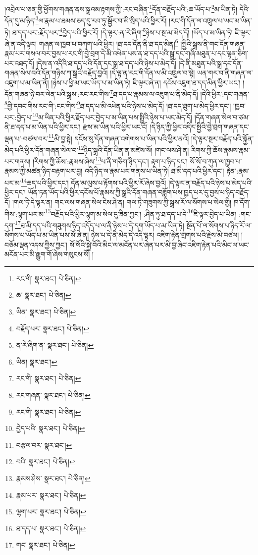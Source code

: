 །འབྲེལ་པ་ཅན་གྱི་ཕྱོགས་གཞན་ནས་སྒྲའམ་རྟགས་ཀྱི་:རང་བཞིན་\footnote{རང་གི་  སྣར་ཐང་།  པེ་ཅིན། }དོན་བརྗོད་པའི་:ཆ་ཡོད་པ་\footnote{ཆ་  སྣར་ཐང་།  པེ་ཅིན། }མ་ཡིན་ཏེ། དེའི་དོན་དུ་མ་ཉིད་\footnote{ཡིན་  སྣར་ཐང་།  པེ་ཅིན། }ལ་རྣམ་པ་ཐམས་ཅད་དུ་རབ་ཏུ་སྦྱོར་བ་མི་སྲིད་པའི་ཕྱིར་རོ། །རང་གི་དོན་ལ་འཁྲུལ་པ་ཡང་མ་ཡིན་ཏེ། ཐ་དད་པར་:རྗོད་པར་\footnote{བརྗོད་པར་  སྣར་ཐང་།  པེ་ཅིན། }བྱེད་པའི་ཕྱིར་རོ། །དེ་ལྟར་:ན་རེ་ཞིག་\footnote{ན་རེ་ཞིག་ན་  སྣར་ཐང་།  པེ་ཅིན། }ཉེས་པ་སྔ་མ་མེད་དོ། །ཡོད་པ་མ་ཡིན་ཏེ། ཇི་ལྟར་ཞེ་ན་འདི་ལྟར། གཞན་ལ་ཁྱབ་པ་བཀག་པའི་ཕྱིར། །ཐ་དད་དོན་ནི་ཐ་དད་མིན།\footnote{ཡིན།  སྣར་ཐང་། } །སྤྱིའི་སྒྲས་ནི་གང་དོན་གཞན་རྣམ་པར་གསལ་བར་བྱས་པ་རང་གི་བྱེ་བྲག་དེ་མི་འཕེན་པས་ན་ཐ་དད་པའི་སྒྲ་དང་གཞི་མཐུན་པ་དང་ལྷན་ཅིག་པར་འཐད་དོ། །དེས་ན་འདིའི་ཐ་དད་པའི་དོན་དང་སྒྲ་ཐ་དད་པའི་ཉེས་པ་མེད་དོ། །དེ་ནི་མཐུན་པའི་སྒྲ་དང་དོན་གཞན་སེལ་བའི་དོན་གཉིས་ཀ་སྒྲའི་བརྗོད་བྱའོ། །དེ་ལྟ་ན་རང་གི་དོན་ལ་མི་འཁྲུལ་བ་སྟེ། ཡན་གར་བ་ནི་གཞན་ལ་འཇུག་པ་མ་ཡིན་ནོ། །ཉེས་པ་ཕྱི་མ་ཡང་ཡོད་པ་མ་ཡིན་ཏེ། ཇི་ལྟར་ཞེ་ན། དངོས་འཇུག་ཐ་དད་མིན་ཕྱིར་ཡང་། །དོན་གཞན་ཉེ་བར་ལེན་པའི་སྒྲས་:རང་རང་གིས་\footnote{རང་གི་  སྣར་ཐང་།  པེ་ཅིན། }ཐ་དད་པ་རྣམས་ལ་འཇུག་པ་ནི་མེད་དོ། །དེའི་ཕྱིར་:དང་གཞན་\footnote{རང་གཞན་  སྣར་ཐང་།  པེ་ཅིན། }གྱི་དབང་གིས་རང་གི་:ངང་གིས་\footnote{རང་གི་  སྣར་ཐང་།  པེ་ཅིན། }ཐ་དད་པ་མི་འཕེན་པའི་ཉེས་པ་མེད་དོ། །ཐ་དད་ཐུག་པ་མེད་ཕྱིར་དང་། །ཁྱབ་པར་:བྱེད་པ་\footnote{བྱེད་པའི་  སྣར་ཐང་།  པེ་ཅིན། }མ་ཡིན་པའི་ཕྱིར་རྗོད་པར་བྱེད་པ་མ་ཡིན་པས་སྤྱིའི་ཉེས་པ་ཡང་མེད་དོ། །དོན་གཞན་སེལ་བ་ཙམ་ནི་ཐ་དད་པ་མ་ཡིན་པའི་ཕྱིར་དང་། རྫས་མ་ཡིན་པའི་ཕྱིར་ཡང་ངོ། །དེ་ཉིད་ཀྱི་ཕྱིར་འདིར་སྤྱིའི་བྱེ་བྲག་གཞན་དང་ལྡན་པ་:བཙལ་བར་\footnote{བརྩལ་བར་  སྣར་ཐང་། }མི་བྱ་སྟེ། དངོས་སུ་དོན་གཞན་འགེགས་པ་ཡིན་པའི་ཕྱིར་ནའོ། །དེ་ལྟར་སྔར་བརྗོད་པའི་སྐྱོན་མེད་པའི་ཕྱིར་དོན་གཞན་སེལ་བ་\footnote{བའི་  སྣར་ཐང་།  པེ་ཅིན། }ཉིད་སྒྲའི་དོན་ཡིན་ན་མཛེས་སོ། །གང་ལས་ཤེ་ན། རིགས་ཀྱི་ཆོས་རྣམས་རྣམ་པར་གནས། །རིགས་ཀྱི་ཆོས་:རྣམས་ཞེས་\footnote{རྣམས་ཤེས་  སྣར་ཐང་།  པེ་ཅིན། }པ་ནི་གཅིག་ཉིད་དང་། རྟག་པ་ཉིད་དང་། སོ་སོ་བ་ཀུན་ལ་ཁྱབ་པ་རྣམས་ཀྱི་མཚན་ཉིད་བརྟག་པར་བྱ། འདི་ཉིད་ལ་རྣམ་པར་གནས་པ་ཡིན་ཏེ། ཐ་མི་དད་པའི་ཕྱིར་དང་། རྟེན་:རྣམ་པར་མ་\footnote{རྣམ་པར་  སྣར་ཐང་།  པེ་ཅིན། }ཆད་པའི་ཕྱིར་དང་། དོན་མ་ལུས་པ་རྟོགས་པའི་ཕྱིར་རོ་ཞེས་བྱའོ། །དེ་ལྟར་ན་བརྗོད་པའི་ཉེས་པ་མེད་པའི་ཕྱིར་དང་། ཡོན་ཏན་ཡོད་པའི་ཕྱིར་དངོས་པོ་རྣམས་ཀྱི་སྒྲའི་དོན་གཞན་བཟློག་པས་ཁྱད་པར་དུ་བྱས་པ་ཉིད་བརྗོད་དོ། །གལ་ཏེ་དེ་ལྟར་ན། གང་ལས་གཞན་སེལ་ངེས་ཤེ་ན། གལ་ཏེ་གཟུགས་ཀྱི་སྒྲས་རོ་ལ་སོགས་པ་སེལ་གྱི། ཁ་དོག་གིས་:ལྷག་པར་མ་\footnote{ལྷག་པར་  སྣར་ཐང་།  པེ་ཅིན། }བརྗོད་པའི་ཕྱིར་ལྷག་མ་སེལ་དུ་ཟིན་ཀྱང་། :ཤིན་ཏུ་ཐ་དད་པ་དེ་\footnote{ཐ་དད་པ་  སྣར་ཐང་།  པེ་ཅིན། }ཇི་ལྟར་བྱེད་པ་ཡིན། :གང་དག་\footnote{གང་  སྣར་ཐང་།  པེ་ཅིན། }ཐ་མི་དད་པའི་གཟུགས་ཉིད་འདོད་པ་ལ་ནི་ཉེས་པ་དེ་དག་ཡོད་པ་མ་ཡིན་ཏེ། སྔོན་པོ་ལ་སོགས་པ་ཉིད་རོ་ལ་སོགས་པ་ཡོད་པ་མ་ཡིན་པས་སོ་ཞེ་ན། ཉེས་པ་དེ་ནི་མེད་དེ་འདི་ལྟར། འཇིག་རྟེན་གྲགས་པའི་རྗེས་མི་བཙལ། །བཅོམ་ལྡན་འདས་ཀྱིས་ཀྱང་། སོ་སོའི་སྐྱེ་བོའི་མིང་ལ་མངོན་པར་ཞེན་པར་མི་བྱ་ཞིང་འཇིག་རྟེན་པའི་མིང་ལ་ཡང་མངོན་པར་མི་རྒྱུག་གོ་ཞེས་གསུངས་སོ། །
